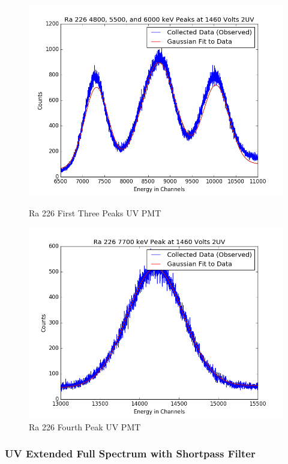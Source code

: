 \documentclass{article}
\begin{document}
\begin{figure}[H]
  \centering
  \begin{minipage}[b]{0.4\textwidth}
    \includegraphics[width=\textwidth]{2UVRa1fit.png}
    \caption{Ra 226 First Three Peaks UV PMT}
  \end{minipage}
  \hfill
  \begin{minipage}[b]{0.4\textwidth}
    \includegraphics[width=\textwidth]{2UVRa4fit.png}
    \caption{Ra 226 Fourth Peak UV PMT}
  \end{minipage}
\end{figure}

\subsubsection{UV Extended Full Spectrum with Shortpass Filter}
\end{document}
